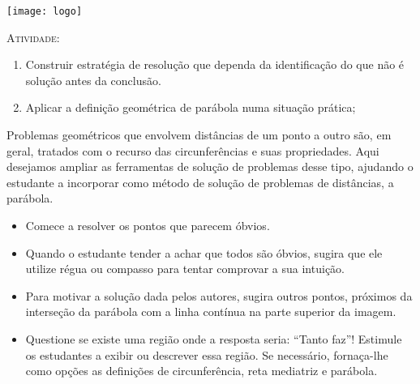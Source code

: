 \documentclass[10 pt,usenames,dvipsnames, oneside]{article}
\begin{document}
\begin{center}
  \begin{minipage}[l]{3cm}
\texttt{[image: logo]}    
\end{minipage}\hfill
\begin{minipage}[r]{.8\textwidth}
 {\Large \scshape Atividade: }  
\end{minipage}
\end{center}
\vspace{.2cm}

\ifdefined\prof

\begin{goals}
\begin{enumerate}
\item {} 
Construir estratégia de resolução que dependa da identificação do que não é solução antes da conclusão.

\item {} 
Aplicar a definição geométrica de parábola numa situação prática;
\end{enumerate}

\tcblower

Problemas geométricos que envolvem distâncias de um ponto a outro são, em geral, tratados com o recurso das circunferências e suas propriedades. Aqui desejamos ampliar as ferramentas de solução de problemas desse tipo, ajudando o estudante a incorporar como método de solução de problemas de distâncias, a parábola.
\begin{itemize}
\item {} 
Comece a resolver os pontos que parecem óbvios.

\item {} 
Quando o estudante tender a achar que todos são óbvios, sugira que ele utilize régua ou compasso para tentar comprovar a sua intuição.

\item {} 
Para motivar a solução dada pelos autores, sugira outros pontos, próximos da interseção da parábola com a linha contínua na parte superior da imagem.

\item {} 
Questione se existe uma região onde a resposta seria: “Tanto faz”! Estimule os estudantes a exibir ou descrever essa região. Se necessário, fornaça-lhe como opções as definições de circunferência, reta mediatriz e parábola.

\end{itemize}
\end{goals}
\end{document}
